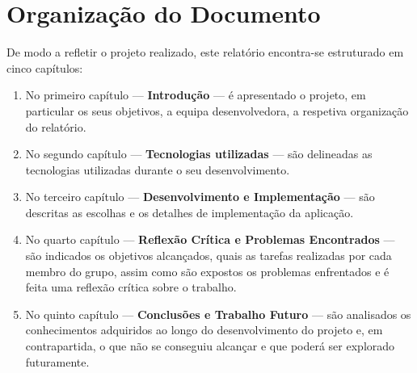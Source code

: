 \section{Organização do Documento}
\label{sec::intro:organizacao}
De modo a refletir o projeto realizado, este relatório encontra-se estruturado em cinco capítulos:

\begin{enumerate}
\item No primeiro capítulo --- \textbf{Introdução} --- é apresentado o projeto, em particular os seus objetivos, a equipa desenvolvedora, a respetiva organização do relatório. %

\item No segundo capítulo --- \textbf{Tecnologias utilizadas} --- são delineadas as tecnologias utilizadas durante o seu desenvolvimento.

\item No terceiro capítulo --- \textbf{Desenvolvimento e Implementação} --- são descritas as escolhas e os detalhes de implementação da aplicação.

\item No quarto capítulo --- \textbf{Reflexão Crítica e Problemas Encontrados} --- são indicados os objetivos alcançados, quais as tarefas realizadas por cada membro do grupo, assim como são expostos os problemas enfrentados e é feita uma reflexão crítica sobre o trabalho.

\item No quinto capítulo --- \textbf{Conclusões e Trabalho Futuro} --- são analisados os conhecimentos adquiridos ao longo do desenvolvimento do projeto e, em contrapartida, o que não se conseguiu alcançar e que poderá ser explorado futuramente.
\end{enumerate}


% 
